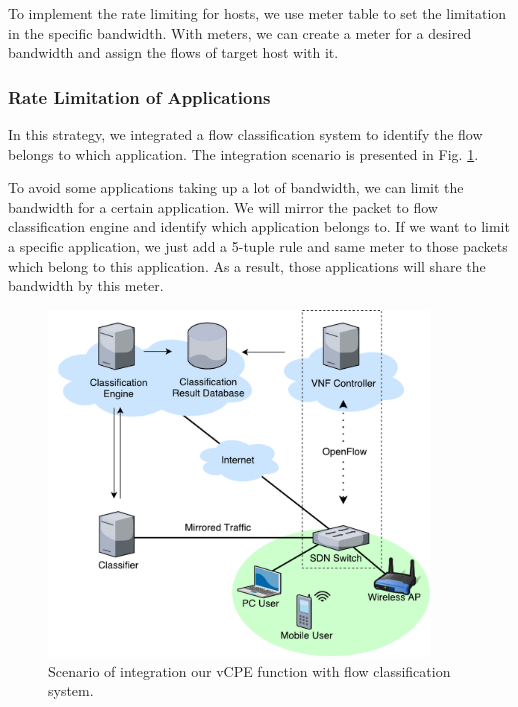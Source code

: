 To implement the rate limiting for hosts, we use meter table to set the limitation in the specific bandwidth.
With meters, we can create a meter for a desired bandwidth and assign the flows of target host with it.

\subsubsection{Rate Limitation of Applications}
In this strategy, we integrated a flow classification system to identify the flow belongs to which application.  The integration scenario is presented in Fig. \ref{fig:class_classifying}.

To avoid some applications taking up a lot of bandwidth, we can limit the bandwidth for a certain application. We will mirror the packet to flow classification engine and identify which application belongs to. If we want to limit a specific application, we just add a 5-tuple rule and same meter to those packets which belong to this application. As a result, those applications will share the bandwidth by this meter.


\begin{figure}[!t]
\centering
\includegraphics[width=0.9\textwidth]{./fig/classification_classifying}
\caption{Scenario of integration our vCPE function with flow classification system.}
\label{fig:class_classifying}
\end{figure}

